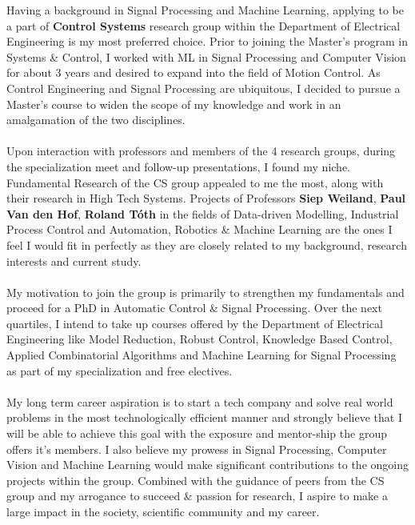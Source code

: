 \documentclass[11pt, a4paper]{awesome-cv}
\begin{document}
\makecvheader

\makelettertitle

\begin{cvletter}
Having a background in Signal Processing and Machine Learning, applying to be a part of \textbf{Control Systems} research group within the Department of Electrical Engineering is my most preferred choice. Prior to joining the Master's program in Systems \& Control, I worked with ML in Signal Processing and Computer Vision for about 3 years and desired to expand into the field of Motion Control. As Control Engineering and Signal Processing are ubiquitous, I decided to pursue a Master's course to widen the scope of my knowledge and work in an amalgamation of the two disciplines.\\ \\
Upon interaction with professors and members of the 4 research groups, during the specialization meet and follow-up presentations, I found my niche. Fundamental Research of the CS group appealed to me the most, along with their research in High Tech Systems. Projects of Professors \textbf{Siep Weiland}, \textbf{Paul Van den Hof}, \textbf{Roland T\'{o}th} in the fields of Data-driven Modelling, Industrial Process Control and Automation, Robotics \& Machine Learning are the ones I feel I would fit in perfectly as they are closely related to my background, research interests and current study.\\ \\
My motivation to join the group is primarily to strengthen my fundamentals and proceed for a PhD in Automatic Control \& Signal Processing. Over the next quartiles, I intend to take up courses offered by the Department of Electrical Engineering like Model Reduction, Robust Control, Knowledge Based Control, Applied Combinatorial Algorithms and Machine Learning for Signal Processing as part of my specialization and free electives.\\ \\ 
My long term career aspiration is to start a tech company and solve real world problems in the most technologically efficient manner and strongly believe that I will be able to achieve this goal with the exposure and mentor-ship the group offers it's members. I also believe my prowess in Signal Processing, Computer Vision and Machine Learning would make significant contributions to the ongoing projects within the group. Combined with the guidance of peers from the CS group and my arrogance to succeed \& passion for research, I aspire to make a large impact in the society, scientific community and my career.
\end{cvletter}

\makeletterclosing
\end{document}
